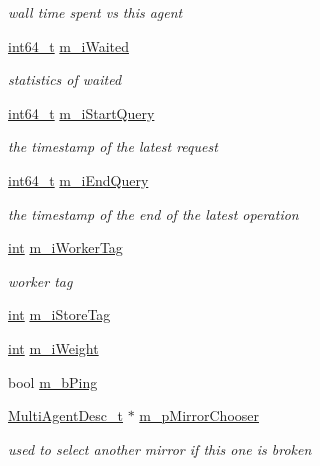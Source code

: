 \begin{DoxyCompactItemize}
\begin{DoxyCompactList}\small\item\em wall time spent vs this agent \end{DoxyCompactList}\item 
\hyperlink{sphinxstd_8h_a996e72f71b11a5bb8b3b7b6936b1516d}{int64\-\_\-t} \hyperlink{structAgentConn__t_ad8d236185b0ff03980532eb039ae0990}{m\-\_\-i\-Waited}
\begin{DoxyCompactList}\small\item\em statistics of waited \end{DoxyCompactList}\item 
\hyperlink{sphinxstd_8h_a996e72f71b11a5bb8b3b7b6936b1516d}{int64\-\_\-t} \hyperlink{structAgentConn__t_a422ec8cb29794eda43e0fb8941fcab86}{m\-\_\-i\-Start\-Query}
\begin{DoxyCompactList}\small\item\em the timestamp of the latest request \end{DoxyCompactList}\item 
\hyperlink{sphinxstd_8h_a996e72f71b11a5bb8b3b7b6936b1516d}{int64\-\_\-t} \hyperlink{structAgentConn__t_aa72a5c38f23e61a419f0bf80509aa337}{m\-\_\-i\-End\-Query}
\begin{DoxyCompactList}\small\item\em the timestamp of the end of the latest operation \end{DoxyCompactList}\item 
\hyperlink{sphinxexpr_8cpp_a4a26e8f9cb8b736e0c4cbf4d16de985e}{int} \hyperlink{structAgentConn__t_a293275c6b9072ed5074553a073b389a9}{m\-\_\-i\-Worker\-Tag}
\begin{DoxyCompactList}\small\item\em worker tag \end{DoxyCompactList}\item 
\hyperlink{sphinxexpr_8cpp_a4a26e8f9cb8b736e0c4cbf4d16de985e}{int} \hyperlink{structAgentConn__t_a6f256b258881ec414716c06a94c97e50}{m\-\_\-i\-Store\-Tag}
\item 
\hyperlink{sphinxexpr_8cpp_a4a26e8f9cb8b736e0c4cbf4d16de985e}{int} \hyperlink{structAgentConn__t_aa30e153ed1e6de625b3a8535b615f5e5}{m\-\_\-i\-Weight}
\item 
bool \hyperlink{structAgentConn__t_ae309e522e296677d68bb51c097b2f3a7}{m\-\_\-b\-Ping}
\item 
\hyperlink{structMultiAgentDesc__t}{Multi\-Agent\-Desc\-\_\-t} $\ast$ \hyperlink{structAgentConn__t_a4dd1c818ec6ec01e16d867b406f7b348}{m\-\_\-p\-Mirror\-Chooser}
\begin{DoxyCompactList}\small\item\em used to select another mirror if this one is broken \end{DoxyCompactList}\end{DoxyCompactItemize}


